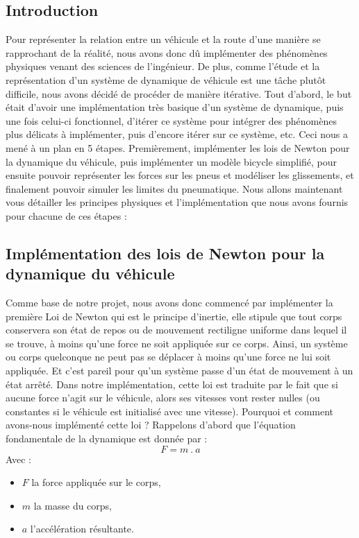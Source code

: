 \subsection{Introduction}\label{subsec:introduction}
Pour représenter la relation entre un véhicule et la route d'une manière se rapprochant de la réalité, nous avons donc dû implémenter des phénomènes physiques venant des sciences de l'ingénieur. De plus, comme l'étude et la représentation d'un système  de dynamique de véhicule est une tâche plutôt difficile, nous avons décidé de procéder de manière itérative. Tout d'abord, le but était d'avoir une implémentation très basique d'un système de dynamique,  puis une fois celui-ci fonctionnel, d'itérer ce système pour intégrer des phénomènes plus délicats à implémenter, puis d'encore itérer sur ce système, etc.
Ceci nous a mené à un plan en 5 étapes.
Premièrement, implémenter les lois de Newton pour la dynamique du véhicule, puis implémenter un modèle bicycle simplifié, pour ensuite pouvoir représenter les forces sur les pneus et modéliser les glissements, et finalement pouvoir simuler les limites du pneumatique.
Nous allons maintenant vous détailler les principes physiques et l'implémentation que nous avons fournis pour chacune de ces étapes :

\subsection{Implémentation des lois de Newton pour la dynamique du véhicule}\label{subsec:implementation-des-lois-de-newton-pour-la-dynamique-du-vehicule}

Comme base de notre projet, nous avons donc commencé par implémenter la première Loi de Newton qui est le principe d'inertie, elle stipule que tout corps conservera son état de repos ou de mouvement rectiligne uniforme dans lequel il se trouve, à moins qu'une force ne soit appliquée sur ce corps. Ainsi, un système ou corps quelconque ne peut pas se déplacer à moins qu'une force ne lui soit appliquée. Et c'est pareil pour qu'un système passe d'un état de mouvement à un état arrêté.
Dans notre implémentation, cette loi est traduite par le fait que si aucune force n'agit sur le véhicule, alors ses vitesses vont rester nulles (ou constantes si le véhicule est initialisé avec une vitesse).
Pourquoi et comment avons-nous implémenté cette loi ?
Rappelons d'abord que l'équation fondamentale de la dynamique est donnée par :
$$F = m \ .\  a$$
Avec :
\begin{itemize}
    \item $F$ la force appliquée sur le corps,
    \item $m$ la masse du corps,
    \item $a$ l'accélération résultante.
\end{itemize}

